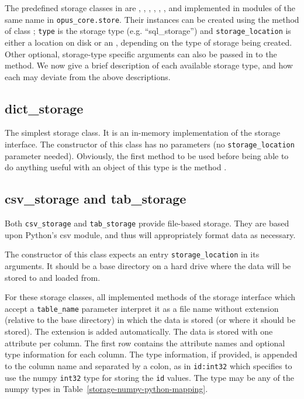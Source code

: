 {The predefined storage classes in  are , ,
, , , , 
and  implemented
in modules of the same name in \verb|opus_core.store|. Their instances can be
created using the method  of
class ; \verb|type| is the storage type (e.g. ``sql_storage'')
and \verb|storage_location| is either a location on disk or an
, depending on the type of storage being created.
Other optional, storage-type specific arguments can also be passed in to the
 method. We now give a brief description of each available
storage type, and how each may deviate from the above descriptions. 

\subsection{dict_storage}
\label{sec:ram-storage}
%
The simplest storage class. It is an in-memory implementation of the
storage interface. The constructor of this class has no parameters (no \verb|storage_location|
parameter needed). Obviously, the first method to be used 
before being able to do anything useful with an object of this type is the method
.

\subsection{csv_storage and tab_storage}
%
Both \verb|csv_storage| and \verb|tab_storage| provide file-based storage.  
They are based upon Python's csv module, and thus will appropriately
format data as necessary.

The constructor of this class expects an entry \verb|storage_location| in its
arguments. It should be a base directory on a hard drive where
the data will be stored to and loaded from.

For these storage classes, all implemented methods of the storage interface which
accept a \verb|table_name| parameter interpret it as a file name without
extension (relative to the base directory) in which the data is stored (or where
it should be stored). The extension is added automatically. The data is stored
with one attribute per column. The first row contains the attribute names and
optional type information for each column. The type information, if provided, is
appended to the column name and separated by a colon, as in \verb|id:int32| which
specifies to use the numpy \verb|int32| type for storing the \verb|id| values. 
The type may be any of the numpy types in
Table~\ref{storage-numpy-python-mapping}.


}
